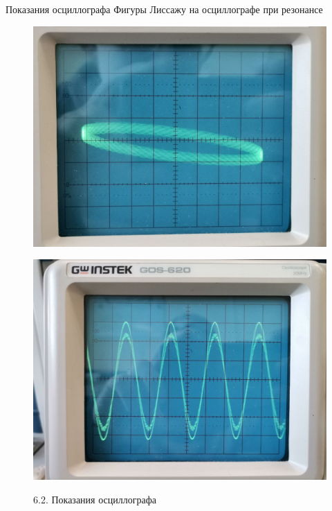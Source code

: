 \documentclass[xcolor=table]{beamer}
\begin{document}
\begin{frame}{Показания осциллографа}
    \centering
    Фигуры Лиссажу на осциллографе при резонансе
    \begin{figure}[ht]
        \begin{minipage}{.5\textwidth}
            \includegraphics[width=0.9\linewidth]{images/oscl.ellipse5.jpg}\\
            \caption{6.1. Показания осциллографа}
            \label{fig:my_label}
        \end{minipage}%
        \begin{minipage}{.5\textwidth}
            \includegraphics[width=0.9\linewidth]{images/oscl1.jpg}\\
            \caption{6.2. Показания осциллографа}
            \label{fig:my_label}
        \end{minipage}
    \end{figure}
\end{frame}
\end{document}
